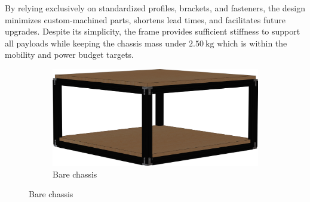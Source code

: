 By relying exclusively on standardized profiles, brackets, and fasteners, the design minimizes custom-machined parts, shortens lead times, and facilitates future upgrades.
Despite its simplicity, the frame provides sufficient stiffness to support all payloads while keeping the chassis mass under \(\SI{2.50}{\kilogram}\) which is within the mobility and power budget targets.


\begin{figure}[H]
  \centering

  \begin{subfigure}[b]{0.4\textwidth}
    \centering
    \includegraphics[width=\textwidth]{imgs/Chasis.png}
    \caption{Bare chassis}
    \label{fig:chassis_iso}
  \end{subfigure}

  \vspace{0em} %


\end{figure}
